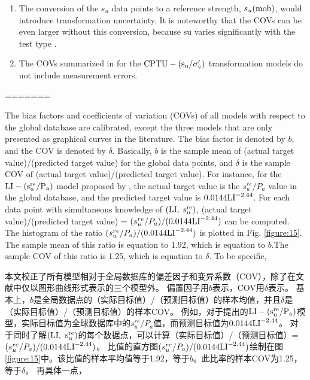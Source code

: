 \begin{paracol}{2}
\begin{enumerate}
        \item The conversion of the $s_u$ data points to a reference strength, $s_u(\rm{mob})$, would introduce transformation uncertainty. It is noteworthy that the COVs can be even larger without this conversion, because su varies significantly with the test type \citep{Ladd1977421}.
        
        \item The COVs summarized in \citet{Ching201252} for the $\rm{CPTU}-(s_u/\sigma_v')$ transformation models do not include measurement errors.
    \end{enumerate}
=======
\begin{Parallel}{0.60\textwidth}{}
    \ParallelLText
    {
        The bias factors and coefficients of variation (COVs) of all models with respect to the global database are calibrated, except the three models that are only presented as graphical curves in the literature. The bias factor is denoted by $b$, and the COV is denoted by $\delta$. Basically, $b$ is the sample mean of (actual target value)/(predicted target value) for the global data points, and $\delta$ is the sample COV of (actual target value)/(predicted target value). For instance, for the $\rm{LI}-(s_u^{re}/P_a)$ model proposed by \citet{Locat1988799}, the actual target value is the $s_u^{re}/P_a$ value in the global database, and the predicted target value is $0.0144\rm{LI}^{-2.44}$. For each data point with simultaneous knowledge of $(\rm{LI},~s_u^{re})$, (actual target value)/(predicted target value) = $(s_u^{re}/P_a)/(0.0144\rm{LI}^{-2.44})$ can be computed. The histogram of the ratio $(s_u^{re}/P_a)/(0.0144\rm{LI}^{-2.44})$ is plotted in Fig. \ref{figure:15}. The sample mean of this ratio is equation to 1.92, which is equation to $b$.The sample COV of this ratio is 1.25, which is  equation to $\delta$. To be specific,
    }
    \ParallelRText
    {
        本文校正了所有模型相对于全局数据库的偏差因子和变异系数（COV），除了在文献中仅以图形曲线形式表示的三个模型外。 偏置因子用$b$表示，COV用$\delta$表示。 基本上，$b$是全局数据点的（实际目标值）/（预测目标值）的样本均值，并且$\delta$是（实际目标值）/（预测目标值）的样本COV。 例如，对于\citet{Locat1988799}提出的$\rm{LI}-(s_u^{re}/P_a)$模型，实际目标值为全球数据库中的$s_u^{re}/P_a$值，而预测目标值为$0.0144\rm{LI}^{-2.44}$。 对于同时了解$(\rm{LI},~s_u^{re})$的每个数据点，可以计算（实际目标值）/（预测目标值）= $(s_u^{re}/P_a)/(0.0144\rm{LI}^{-2.44})$。 比值的直方图$(s_u^{re}/P_a)/(0.0144\rm{LI}^{-2.44})$绘制在图\ref{figure:15}中。该比值的样本平均值等于1.92，等于$b$。此比率的样本COV为1.25，等于$\delta$。 再具体一点，
        
}
\end{Parallel}
\end{paracol}
